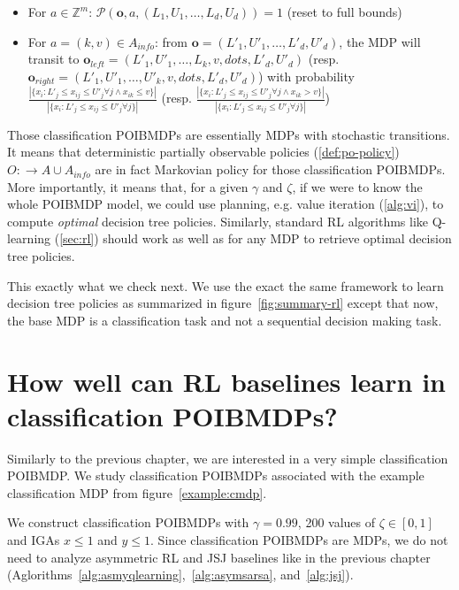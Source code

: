 \begin{definition}
\begin{itemize}
        \begin{itemize}
            \item For $a \in \mathbb{Z}^m$: $\mathcal{P}(\boldsymbol{o}, a, (L_1, U_1, \dots, L_d, U_d)) = 1$ (reset to full bounds)
            \item For $a = (k, v) \in A_{info}$: from $\boldsymbol{o}=(L'_1, U'_1, \dots, L'_d, U'_d)$, the MDP will transit to $\boldsymbol{o}_{left} = (L'_1, U'_1, \dots, L_k, v, dots, L'_d, U'_d)$ (resp. $\boldsymbol{o}_{right} = (L'_1, U'_1, \dots, U'_k, v, dots, L'_d, U'_d)$) with probability $\frac{|\{{x}_i: L'_j \leq x_{ij} \leq U'_j \forall j \land x_{ik} \leq v\}|}{|\{x_i: L'_j \leq x_{ij} \leq U'_j \forall j\}|}$ (resp. $\frac{|\{x_i: L'_j \leq x_{ij} \leq U'_j \forall j \land x_{ik} > v\}|}{|\{x_i: L'_j \leq x_{ij} \leq U'_j \forall j\}|}$)
        \end{itemize}
    \end{itemize}
\end{definition}

Those classification POIBMDPs are essentially MDPs with stochastic transitions.
It means that deterministic partially observable policies (\ref{def:po-policy}) $O:\rightarrow A\cup A_{info}$ are in fact Markovian policy for those classification POIBMDPs.
More importantly, it means that, for a given $\gamma$ and $\zeta$, if we were to know the whole POIBMDP model, we could use planning, e.g. value iteration (\ref{alg:vi}), to compute \textit{optimal} decision tree policies.
Similarly, standard RL algorithms like Q-learning (\ref{sec:rl}) should work as well as for any MDP to retrieve optimal decision tree policies.

This exactly what we check next.
We use the exact the same framework to learn decision tree policies as summarized in figure~\ref{fig:summary-rl} except that now, the base MDP is a classification task and not a sequential decision making task.

\section{How well can RL baselines learn in classification POIBMDPs?}
Similarly to the previous chapter, we are interested in a very simple classification POIBMDP.
We study classification POIBMDPs associated with the example classification MDP from figure~\ref{example:cmdp}.

We construct classification POIBMDPs with $\gamma=0.99$, 200 values of $\zeta \in [0,1]$ and IGAs $x\leq 1$ and $y\leq 1$.
Since classification POIBMDPs are MDPs, we do not need to analyze asymmetric RL and JSJ baselines like in the previous chapter (Aglorithms~\ref{alg:asmyqlearning},~\ref{alg:asymsarsa}, and~\ref{alg:jsj}).

